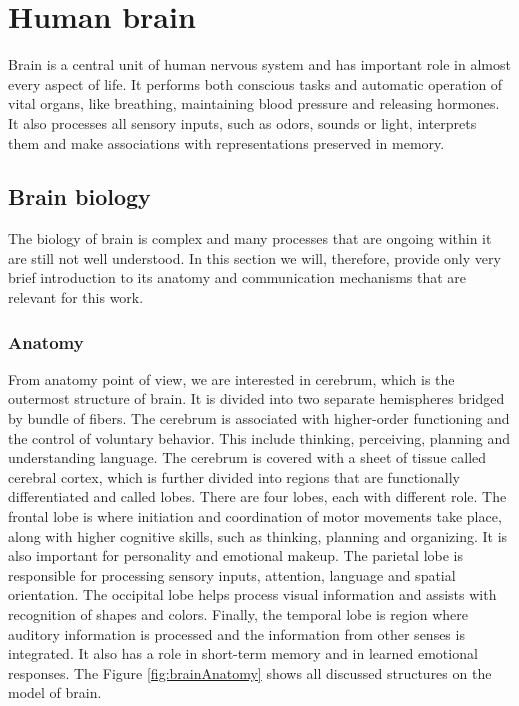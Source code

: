 \chapter{Human brain} \label{humanBrain}
Brain is a central unit of human nervous system and has important role in almost
every aspect of life. It performs both conscious tasks and automatic operation
of vital organs, like breathing, maintaining blood pressure and releasing
hormones. It also processes all sensory inputs, such as odors, sounds or light,
interprets them and make associations with representations preserved in memory.
\section{Brain biology}
The biology of brain is complex and many processes that are ongoing within it
are still not well understood. In this section we will, therefore, provide only
very brief introduction to its anatomy and communication mechanisms that are
relevant for this work.
\subsection{Anatomy}
From anatomy point of view, we are interested in cerebrum, which is the
outermost structure of brain. It is divided into two separate hemispheres
bridged by bundle of fibers. The cerebrum is associated with higher-order
functioning and the control of voluntary behavior. This include thinking,
perceiving, planning and understanding language. The cerebrum is covered with a
sheet of tissue called cerebral cortex, which is further divided into regions
that are functionally differentiated and called lobes. There are four lobes,
each with different role. The frontal lobe is where initiation and coordination
of motor movements take place, along with higher cognitive skills, such as
thinking, planning and organizing. It is also important for personality and
emotional makeup. The parietal lobe is responsible for processing sensory
inputs, attention, language and spatial orientation. The occipital lobe helps
process visual information and assists with recognition of shapes and colors.
Finally, the temporal lobe is region where auditory information is processed and
the information from other senses is integrated. It also has a role in
short-term memory and in learned emotional responses. \cite{brainFacts} The
Figure \ref{fig:brainAnatomy} shows all discussed structures on the model of brain.


